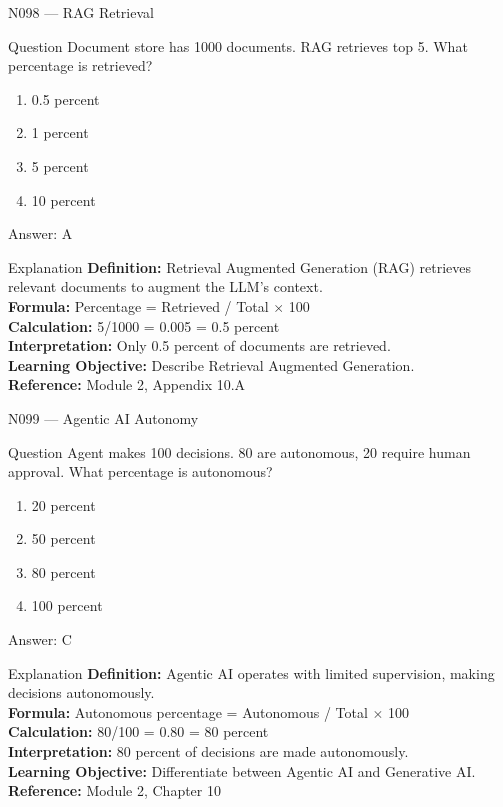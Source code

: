 \documentclass[aspectratio=169,8pt]{beamer}
\begin{document}
	\begin{frame}{N098 --- RAG Retrieval}
		\begin{block}{Question}
			Document store has 1000 documents. RAG retrieves top 5. What percentage is retrieved?
			\begin{enumerate}
				\item 0.5 percent
				\item 1 percent
				\item 5 percent
				\item 10 percent
			\end{enumerate}
		\end{block}
		\begin{exampleblock}{Answer: A}\end{exampleblock}
		\begin{block}{Explanation}
			\textbf{Definition:} Retrieval Augmented Generation (RAG) retrieves relevant documents to augment the LLM's context.\\
			\textbf{Formula:} Percentage = Retrieved / Total $\times$ 100\\
			\textbf{Calculation:} 5/1000 = 0.005 = 0.5 percent\\
			\textbf{Interpretation:} Only 0.5 percent of documents are retrieved.\\
			\textbf{Learning Objective:} Describe Retrieval Augmented Generation.\\
			\textbf{Reference:} Module 2, Appendix 10.A
		\end{block}
	\end{frame}
	
	\begin{frame}{N099 --- Agentic AI Autonomy}
		\begin{block}{Question}
			Agent makes 100 decisions. 80 are autonomous, 20 require human approval. What percentage is autonomous?
			\begin{enumerate}
				\item 20 percent
				\item 50 percent
				\item 80 percent
				\item 100 percent
			\end{enumerate}
		\end{block}
		\begin{exampleblock}{Answer: C}\end{exampleblock}
		\begin{block}{Explanation}
			\textbf{Definition:} Agentic AI operates with limited supervision, making decisions autonomously.\\
			\textbf{Formula:} Autonomous percentage = Autonomous / Total $\times$ 100\\
			\textbf{Calculation:} 80/100 = 0.80 = 80 percent\\
			\textbf{Interpretation:} 80 percent of decisions are made autonomously.\\
			\textbf{Learning Objective:} Differentiate between Agentic AI and Generative AI.\\
			\textbf{Reference:} Module 2, Chapter 10
		\end{block}
	\end{frame}
	
\end{document}
